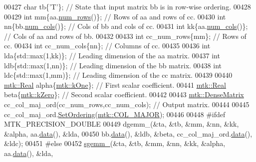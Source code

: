 \begin{DoxyCode}
00427   \textcolor{keywordtype}{char} tb\{\textcolor{charliteral}{'T'}\}; \textcolor{comment}{// State that input matrix bb is in row-wise ordering.}
00428 
00429   \textcolor{keywordtype}{int} mm\{aa.\hyperlink{classmtk_1_1DenseMatrix_a53f3afb3b6a8d21854458aaa9663cc74}{num\_rows}()\};  \textcolor{comment}{// Rows of aa and rows of cc.}
00430   \textcolor{keywordtype}{int} nn\{bb.\hyperlink{classmtk_1_1DenseMatrix_a41747502d468c6728a4be31501b16e0e}{num\_cols}()\};  \textcolor{comment}{// Cols of bb and cols of cc.}
00431   \textcolor{keywordtype}{int} kk\{aa.\hyperlink{classmtk_1_1DenseMatrix_a41747502d468c6728a4be31501b16e0e}{num\_cols}()\};  \textcolor{comment}{// Cols of aa and rows of bb.}
00432 
00433   \textcolor{keywordtype}{int} cc\_num\_rows\{mm\};  \textcolor{comment}{// Rows of cc.}
00434   \textcolor{keywordtype}{int} cc\_num\_cols\{nn\};  \textcolor{comment}{// Columns of cc.}
00435 
00436   \textcolor{keywordtype}{int} lda\{std::max(1,kk)\};  \textcolor{comment}{// Leading dimension of the aa matrix.}
00437   \textcolor{keywordtype}{int} ldb\{std::max(1,nn)\};  \textcolor{comment}{// Leading dimension of the bb matrix.}
00438   \textcolor{keywordtype}{int} ldc\{std::max(1,mm)\};  \textcolor{comment}{// Leading dimension of the cc matrix.}
00439 
00440   \hyperlink{group__c01-roots_gac080bbbf5cbb5502c9f00405f894857d}{mtk::Real} alpha\{\hyperlink{group__c01-roots_ga26407c24d43b6b95480943340d285c71}{mtk::kOne}\}; \textcolor{comment}{// First scalar coefficient.}
00441   \hyperlink{group__c01-roots_gac080bbbf5cbb5502c9f00405f894857d}{mtk::Real} beta\{\hyperlink{group__c01-roots_ga59a451a5fae30d59649bcda274fea271}{mtk::kZero}\}; \textcolor{comment}{// Second scalar coefficient.}
00442 
00443   \hyperlink{classmtk_1_1DenseMatrix}{mtk::DenseMatrix} cc\_col\_maj\_ord(cc\_num\_rows,cc\_num\_cols); \textcolor{comment}{// Output matrix.}
00444 
00445   cc\_col\_maj\_ord.\hyperlink{classmtk_1_1DenseMatrix_a178e63f365cf8c547dc5020c60357f5e}{SetOrdering}(\hyperlink{namespacemtk_ga622801bd9f912d0f976c3e383f5f581ca7c11989c132253fb76b8f6b1314f7e13}{mtk::COL\_MAJOR});
00446 
00448 \textcolor{preprocessor}{  #ifdef MTK\_PRECISION\_DOUBLE}
00449   dgemm\_(&ta, &tb, &mm, &nn, &kk, &alpha, aa.\hyperlink{classmtk_1_1DenseMatrix_a0c33b8a9e01d157c61ddbdf807c25d84}{data}(), &lda,
00450          bb.\hyperlink{classmtk_1_1DenseMatrix_a0c33b8a9e01d157c61ddbdf807c25d84}{data}(), &ldb, &beta, cc\_col\_maj\_ord.\hyperlink{classmtk_1_1DenseMatrix_a0c33b8a9e01d157c61ddbdf807c25d84}{data}(), &ldc);
00451 \textcolor{preprocessor}{  #else}
00452   \hyperlink{namespacemtk_adb7c0560326b8e57f255e58b87ec76b0}{sgemm\_}(&ta, &tb, &mm, &nn, &kk, &alpha, aa.\hyperlink{classmtk_1_1DenseMatrix_a0c33b8a9e01d157c61ddbdf807c25d84}{data}(), &lda,

\end{DoxyCode}
